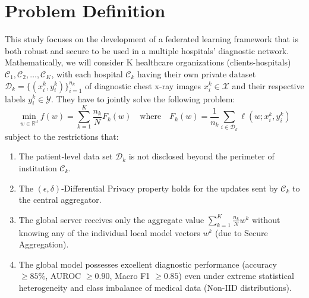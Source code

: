 \documentclass[12pt,a4paper]{report}
\begin{document}
\section{Problem Definition}
This study focuses on the development of a federated learning framework that is both robust and secure to be used in a multiple hospitals’ diagnostic network. Mathematically, we will consider K healthcare organizations (clients-hospitals) $\mathcal{C}_1, \mathcal{C}_2, \dots, \mathcal{C}_K$, with each hospital $\mathcal{C}_k$ having their own private dataset $\mathcal{D}_k = \{(x_i^k, y_i^k)\}_{i=1}^{n_k}$ of diagnostic chest x-ray images $x_i^k \in \mathcal{X}$ and their respective labels $y_i^k \in \mathcal{Y}$. They have to jointly solve the following problem:
\begin{equation}
    \min_{w \in \mathbb{R}^d} f(w) = \sum_{k=1}^K \frac{n_k}{N} F_k(w) \quad \text{where} \quad F_k(w) = \frac{1}{n_k} \sum_{i \in \mathcal{D}_k} \ell(w; x_i^k, y_i^k)
\end{equation}
subject to the restrictions that:
\begin{enumerate}
    \item The patient-level data set $\mathcal{D}_k$ is not disclosed beyond the perimeter of institution $\mathcal{C}_k$.
    \item The $(\epsilon, \delta)$-Differential Privacy property holds for the updates sent by $\mathcal{C}_k$ to the central aggregator.
    \item The global server receives only the aggregate value $\sum_{k=1}^K \frac{n_k}{N} w^k$ without knowing any of the individual local model vectors $w^k$ (due to Secure Aggregation).
    \item The global model possesses excellent diagnostic performance (accuracy $\ge 85\%$, AUROC $\ge 0.90$, Macro F1 $\ge 0.85$) even under extreme statistical heterogeneity and class imbalance of medical data (Non-IID distributions).
\end{enumerate}
\end{document}
